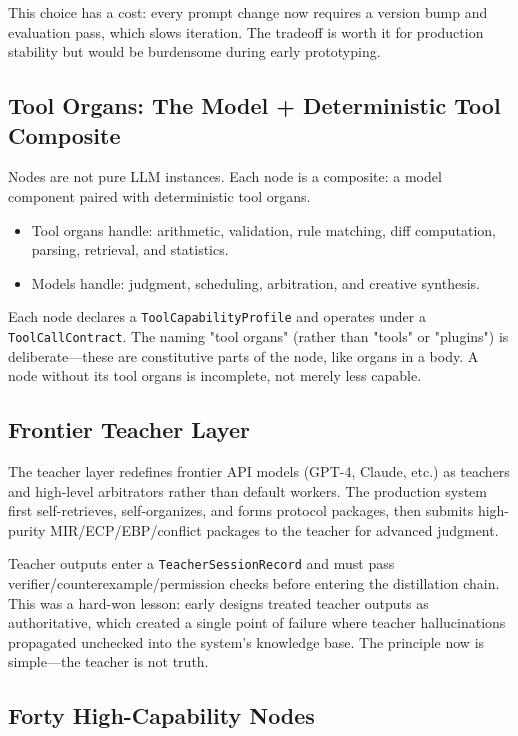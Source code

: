 \documentclass[12pt,a4paper]{article}
\begin{document}
This choice has a cost: every prompt change now requires a version bump and evaluation pass, which slows iteration. The tradeoff is worth it for production stability but would be burdensome during early prototyping.

\subsection{Tool Organs: The Model + Deterministic Tool Composite}


Nodes are not pure LLM instances. Each node is a composite: a model component paired with deterministic tool organs.

\begin{itemize}
  \item Tool organs handle: arithmetic, validation, rule matching, diff computation, parsing, retrieval, and statistics.
  \item Models handle: judgment, scheduling, arbitration, and creative synthesis.
\end{itemize}


Each node declares a \texttt{ToolCapabilityProfile} and operates under a \texttt{ToolCallContract}. The naming "tool organs" (rather than "tools" or "plugins") is deliberate---these are constitutive parts of the node, like organs in a body. A node without its tool organs is incomplete, not merely less capable.

\subsection{Frontier Teacher Layer}


The teacher layer redefines frontier API models (GPT-4, Claude, etc.) as teachers and high-level arbitrators rather than default workers. The production system first self-retrieves, self-organizes, and forms protocol packages, then submits high-purity MIR/ECP/EBP/conflict packages to the teacher for advanced judgment.

Teacher outputs enter a \texttt{TeacherSessionRecord} and must pass verifier/counterexample/permission checks before entering the distillation chain. This was a hard-won lesson: early designs treated teacher outputs as authoritative, which created a single point of failure where teacher hallucinations propagated unchecked into the system's knowledge base. The principle now is simple---the teacher is not truth.

\subsection{Forty High-Capability Nodes}
\end{document}
